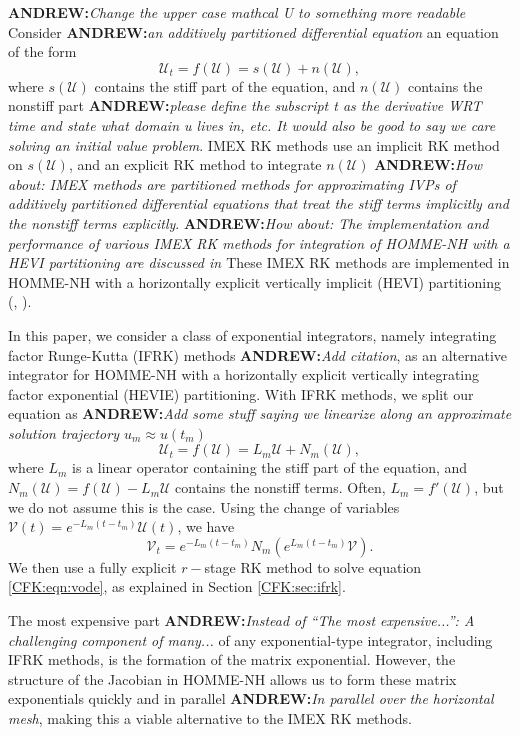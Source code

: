 \documentclass{csri19}
\newcommand{\CFKU}{\mathcal{U}}
\newcommand{\CFKV}{\mathcal{V}}
\newcommand{\A}[1]{\textbf{ANDREW:}\textit{#1}}
\begin{document}
\A{Change the upper case mathcal U to something more readable}
Consider \A{an additively partitioned differential equation} an equation of the form \[ \CFKU_t = f(\CFKU) = s(\CFKU) + 
n(\CFKU),\] where $s(\CFKU)$ contains the stiff part of the equation, and 
$n(\CFKU)$ contains the nonstiff part \A{please define the subscript t as the derivative WRT time and state what domain u lives in, etc.  It would also be good to say we care solving an initial value problem}. IMEX RK methods use an implicit RK 
method on $s(\CFKU)$, and an explicit RK method to integrate $n(\CFKU)$ \A{How about:  IMEX methods are partitioned methods for approximating IVPs of additively partitioned differential equations that treat the stiff terms implicitly and the nonstiff terms explicitly}. \A{How about:  The implementation and performance of various IMEX RK methods for integration of HOMME-NH with a HEVI partitioning are discussed in \cite{CFK:Steyer2019}}
These IMEX RK methods are implemented in HOMME-NH with a horizontally 
explicit vertically implicit (HEVI) partitioning (\cite{CFK:Steyer2019}, 
\cite{CFK:Vogl2019}).

In this paper, we consider a class of exponential integrators, namely 
integrating factor Runge-Kutta (IFRK) methods \A{Add citation}, as an alternative integrator 
for HOMME-NH with a horizontally explicit vertically integrating factor 
exponential (HEVIE) partitioning. With IFRK methods, we split our equation 
as \A{Add some stuff saying we linearize along an approximate solution trajectory $u_m \approx u(t_m)$} \[ \CFKU_t = f(\CFKU) = L_m\CFKU +  N_m(\CFKU),\] where $L_m$ is a 
linear operator containing the stiff part of the equation, and $N_m(\CFKU) 
= f(\CFKU)-L_m\CFKU$ contains the nonstiff terms. Often, $L_m = f'(\CFKU)$, 
but we do not assume this is the case. Using the change of variables 
$\CFKV(t) = e^{-L_m(t-t_m)}\CFKU(t)$, we have \begin{equation}
\label{CFK:eqn:vode}
\CFKV_t = e^{-L_m(t-t_m)}N_m(e^{L_m(t-t_m)}\CFKV). \end{equation} 
We then use a fully explicit $r-$stage RK method to solve equation 
\ref{CFK:eqn:vode}, as explained in Section \ref{CFK:sec:ifrk}.

The most expensive part \A{Instead of ``The most expensive...'': A challenging component of many...} of any exponential-type integrator, including IFRK 
methods, is the formation of the matrix exponential. However, the structure 
of the Jacobian in HOMME-NH allows us to form these matrix exponentials 
quickly and in parallel \A{In parallel over the horizontal mesh}, making this a viable alternative to the IMEX 
RK methods.
\end{document}
